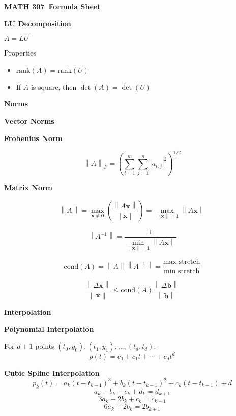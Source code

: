 \documentclass[10pt]{article}
\newcommand\sectionheading[1]{\begin{center}\large{\textbf{#1}}\end{center}\normalsize}
\newcommand\heading[1]{\textbf{#1}}
\newcommand{\norm}[1]{\left\lVert#1\right\rVert}
\newcommand{\rank}{\mathrm{rank}}
\newcommand{\inv}{^{-1}}
\newcommand{\cond}{\mathrm{cond}}
\newcommand{\bv}[1]{\mathbf{#1}}                                %
\newcommand{\x}{\bv x}
\renewcommand{\b}{\bv b}
\newcommand{\ds}{\displaystyle}
\newcommand{\lrb}[1]{\left( #1 \right)}
\newcommand*{\course}{MATH 307}
\begin{document}
\begin{center}
    \huge{\textbf{\course \ Formula Sheet}}
\end{center}

\begin{multicols*}{2}

\sectionheading{LU Decomposition}

$A=LU$

Properties
\begin{itemize}[noitemsep, topsep=0pt]
    \item $\rank(A)=\rank(U)$
    \item If $A$ is square, then $\det(A)=\det(U)$
\end{itemize}

\sectionheading{Norms}

\heading{Vector Norms}

\heading{Frobenius Norm}

\[\norm A_F=\lrb{\sum_{i=1}^m\sum_{j=1}^n |a_{i,j}|^2}^{1/2}\]

\heading{Matrix Norm}

\[\norm A=\max_{\x\ne\bv 0}\lrb{\frac{\norm{A\x}}{\norm\x}}=\max_{\norm\x=1}\norm{A\x}\]

\[\norm{A\inv}=\frac{1}{\ds\min_{\norm\x=1}\norm{A\x}}\]

\[\cond(A)=\norm A\norm{A\inv}=\frac{\text{max stretch}}{\text{min stretch}}\]

\[\frac{\norm{\Delta\x}}{\norm\x}\le\cond(A)\frac{\norm{\Delta\b}}{\norm\b}\]

\sectionheading{Interpolation}

\heading{Polynomial Interpolation}

For $d+1$ points $(t_0,y_0),(t_1,y_1),\ldots,(t_d,t_d)$,
\[p(t)=c_0+c_1t+\cdots+c_dt^d\]

\heading{Cubic Spline Interpolation}
\[p_k(t)=a_k(t-t_{k-1})^3+b_k(t-t_{k-1})^2+c_k(t-t_{k-1})+d\]
\[a_k+b_k+c_k+d_k=d_{k+1}\]
\[3a_k+2b_k+c_k=c_{k+1}\]
\[6a_k+2b_k=2b_{k+1}\]


\end{multicols*}
\end{document}
